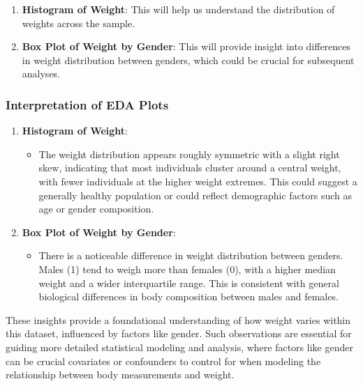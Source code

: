 \documentclass[
]{article}
\providecommand{\tightlist}{%
  \setlength{\itemsep}{0pt}\setlength{\parskip}{0pt}}
\begin{document}
\begin{enumerate}
\def\labelenumi{\arabic{enumi}.}
\tightlist
\item
  \textbf{Histogram of Weight}: This will help us understand the
  distribution of weights across the sample.
\item
  \textbf{Box Plot of Weight by Gender}: This will provide insight into
  differences in weight distribution between genders, which could be
  crucial for subsequent analyses.
\end{enumerate}

\hypertarget{interpretation-of-eda-plots}{%
\subsubsection{Interpretation of EDA
Plots}\label{interpretation-of-eda-plots}}

\begin{enumerate}
\def\labelenumi{\arabic{enumi}.}
\tightlist
\item
  \textbf{Histogram of Weight}:

  \begin{itemize}
  \tightlist
  \item
    The weight distribution appears roughly symmetric with a slight
    right skew, indicating that most individuals cluster around a
    central weight, with fewer individuals at the higher weight
    extremes. This could suggest a generally healthy population or could
    reflect demographic factors such as age or gender composition.
  \end{itemize}
\item
  \textbf{Box Plot of Weight by Gender}:

  \begin{itemize}
  \tightlist
  \item
    There is a noticeable difference in weight distribution between
    genders. Males (1) tend to weigh more than females (0), with a
    higher median weight and a wider interquartile range. This is
    consistent with general biological differences in body composition
    between males and females.
  \end{itemize}
\end{enumerate}

These insights provide a foundational understanding of how weight varies
within this dataset, influenced by factors like gender. Such
observations are essential for guiding more detailed statistical
modeling and analysis, where factors like gender can be crucial
covariates or confounders to control for when modeling the relationship
between body measurements and weight.
\end{document}

